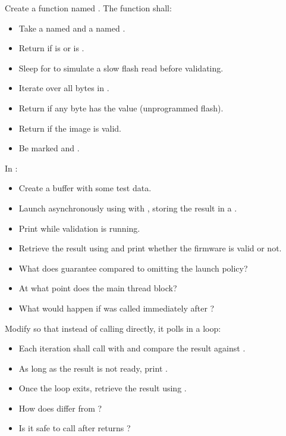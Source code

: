 Create a function named . The function shall:
\begin{itemize}
  \item Take a  named  and a  named
    .
  \item Return  if  is  or  is .
  \item Sleep for  to simulate a slow flash read before validating.
  \item Iterate over all bytes in .
  \item Return  if any byte has the value  (unprogrammed flash).
  \item Return  if the image is valid.
  \item Be marked  and \code{[[nodiscard]]}.
\end{itemize}
In :
\begin{itemize}
  \item Create a buffer with some test data.
  \item Launch  asynchronously using  with
    , storing the result in a .
  \item Print  while validation is running.
  \item Retrieve the result using  and print whether the firmware is valid or
    not.
\end{itemize}

\begin{itemize}
  \item What does  guarantee compared to omitting the launch policy?
  \item At what point does the main thread block?
  \item What would happen if  was called immediately after ?
\end{itemize}

\label{c6:ex:7.2}
Modify  so that instead of calling  directly, it polls in a loop:
\begin{itemize}
  \item Each iteration shall call  with
     and compare the result against
    .
  \item As long as the result is not ready, print .
  \item Once the loop exits, retrieve the result using .
\end{itemize}

\begin{itemize}
  \item How does  differ from ?
  \item Is it safe to call  after  returns
    ?
\end{itemize}
